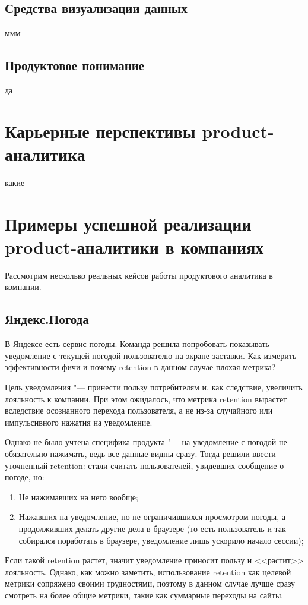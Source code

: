 \documentclass[referat, times]{SCWorks}
\begin{document}
\subsection{Средства визуализации данных}
ммм

\subsection{Продуктовое понимание}
да

\section{Карьерные перспективы product-аналитика}
какие

\section{Примеры успешной реализации product-аналитики в компаниях}
Рассмотрим несколько реальных кейсов работы продуктового аналитика в компании.
\subsection{Яндекс.Погода}
В Яндексе есть сервис погоды. Команда решила попробовать показывать уведомление с текущей погодой пользователю на экране заставки. Как измерить эффективности фичи и почему retention в данном случае плохая метрика?

Цель уведомления "--- принести пользу потребителям и, как следствие, увеличить лояльность к компании. При этом ожидалось, что метрика retention вырастет вследствие осознанного перехода пользователя, а не из-за случайного или импульсивного нажатия на уведомление.

Однако не было учтена специфика продукта "--- на уведомление с погодой не обязательно нажимать, ведь все данные видны сразу. Тогда решили ввести уточненный retention: стали считать пользователей, увидевших сообщение о погоде, но:

\begin{enumerate}
    \item Не нажимавших на него вообще;
    \item Нажавших на уведомление, но не ограничившихся просмотром погоды, а продолживших делать другие дела в браузере 
    (то есть пользователь и так собирался поработать в браузере, уведомление лишь ускорило начало сессии);
\end{enumerate}

Если такой retention растет, значит уведомление приносит пользу и <<растит>> лояльность. Однако, как можно заметить, использование retention как целевой метрики сопряжено своими трудностями, поэтому в данном случае лучше сразу смотреть на более общие метрики, такие как суммарные переходы на сайты\cite{yandexWeather}.
\end{document}
